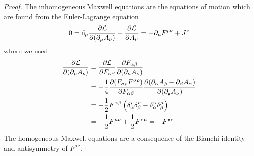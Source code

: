 \mweqtensor
\begin{proof}
	The inhomogeneous Maxwell equations are the equations of motion which are found from the Euler-Lagrange equation
	\begin{equation*}
		0
		=
		\partial_\mu
		\pdv{\mathcal{L}}{(\partial_\mu A_\nu)}
		-
		\pdv{\mathcal{L}}{A_\nu}
		=
		-
		\partial_\mu
		F^{\mu\nu}
		+
		J^\nu
	\end{equation*}
	where we used
	\begin{equation*}
		\begin{split}
			\pdv{\mathcal{L}}{(\partial_\mu A_\nu)}
			&=
			\pdv{\mathcal{L}}{F_{\alpha\beta}}
			\pdv{F_{\alpha\beta}}{(\partial_\mu A_\nu)}
			\\
			&=
			-
			\frac{1}{4}
			\pdv{(F_{\sigma\rho}F^{\sigma\rho})}{F_{\alpha\beta}}
			\pdv{(\partial_\alpha A_\beta-\partial_\beta A_\alpha)}{(\partial_\mu A_\nu)}
			\\
			&=
			-
			\frac{1}{2}
			F^{\alpha\beta}
			\left(
				\delta_\alpha^\mu
				\delta_\beta^\nu
				-
				\delta_\alpha^\nu
				\delta_\beta^\mu
			\right)
			\\
			&=
			-
			\frac{1}{2}
			F^{\mu\nu}
			+
			\frac{1}{2}
			F^{\nu\mu}
			=
			-
			F^{\mu\nu}			
		\end{split}
	\end{equation*}
	The homogeneous Maxwell equations are a consequence of the Bianchi identity and antisymmetry of $F^{\mu\nu}$.
\end{proof}
\mweqvector
